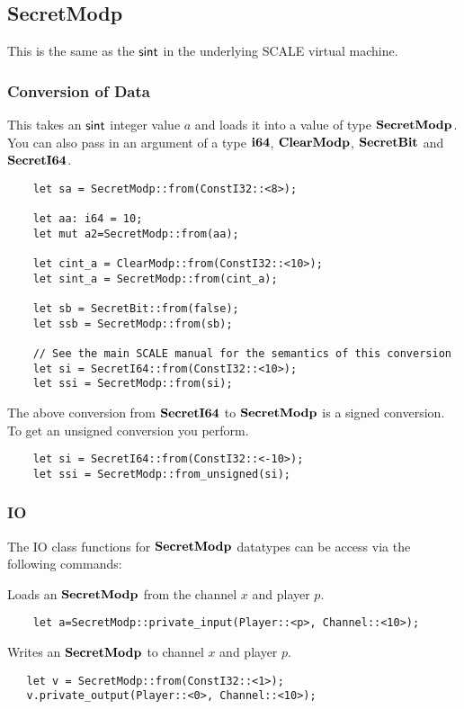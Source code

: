 \subsection{SecretModp}
This is the same as the $\mathsf{sint}$ in the underlying SCALE virtual machine.

\subsubsection{Conversion of Data}
This takes an $\mathsf{sint}$ integer value $a$ and loads it into a value
of type $\mathbf{SecretModp}$.
You can also pass in an argument of a type $\mathbf{i64}$, $\mathbf{ClearModp}$,
$\mathbf{SecretBit}$ and $\mathbf{SecretI64}$.
\begin{lstlisting}
    let sa = SecretModp::from(ConstI32::<8>);

    let aa: i64 = 10;
    let mut a2=SecretModp::from(aa);

    let cint_a = ClearModp::from(ConstI32::<10>);
    let sint_a = SecretModp::from(cint_a);

    let sb = SecretBit::from(false);
    let ssb = SecretModp::from(sb);

    // See the main SCALE manual for the semantics of this conversion
    let si = SecretI64::from(ConstI32::<10>);
    let ssi = SecretModp::from(si);
\end{lstlisting}

The above conversion from $\mathbf{SecretI64}$ to $\mathbf{SecretModp}$ is a signed conversion.
To get an unsigned conversion you perform.
\begin{lstlisting}
    let si = SecretI64::from(ConstI32::<-10>);
    let ssi = SecretModp::from_unsigned(si);
\end{lstlisting}

\subsubsection{IO}
The IO class functions for $\mathbf{SecretModp}$ datatypes can be access via the following commands:

Loads an $\mathbf{SecretModp}$ from the channel $x$ and player $p$.
\begin{lstlisting}
    let a=SecretModp::private_input(Player::<p>, Channel::<10>);
\end{lstlisting}

Writes an $\mathbf{SecretModp}$ to channel $x$ and player $p$.
\begin{lstlisting}
   let v = SecretModp::from(ConstI32::<1>);
   v.private_output(Player::<0>, Channel::<10>);
\end{lstlisting}


